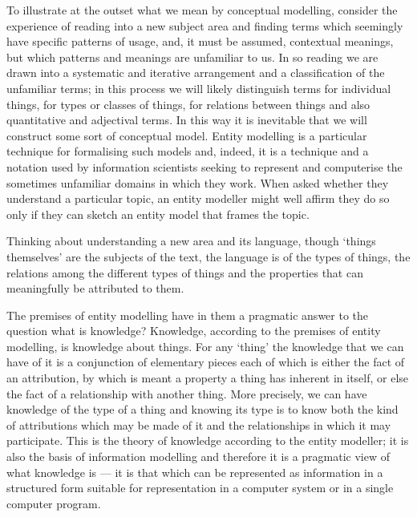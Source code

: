 To illustrate at the outset what we mean by conceptual modelling, consider the experience of reading into a new subject area and finding terms which seemingly have specific patterns of usage, and, it must be assumed, contextual meanings, but which patterns and meanings are unfamiliar to us. In so reading we are drawn into a systematic and iterative arrangement and a classification of the unfamiliar terms; in this process we will likely distinguish terms for individual things, for types or classes of things, for relations between things and also quantitative and adjectival terms. In this way it is inevitable that we will construct some sort of conceptual model. 
Entity modelling is a particular technique for formalising such models and, indeed, it is a technique and a notation used by information scientists seeking to represent and computerise the sometimes unfamiliar domains in which they work. When asked whether they understand a particular topic, an entity modeller might well affirm they do so only if they can sketch an entity model that frames the topic.

Thinking about understanding a new area and its language, though ‘things themselves’ are the subjects of the text, the language is of the types of things, the relations among the different types of things and the properties that can meaningfully be attributed to them. 

The premises of entity modelling have in them a pragmatic answer to the question what is knowledge? Knowledge, according to the premises of entity modelling, is knowledge about things. For any ‘thing’ the knowledge that we can have of it is a conjunction of elementary pieces each of which is either the fact of an attribution, by which is meant a property a thing has inherent in itself, or else the fact of a relationship with another thing. More precisely, we can have knowledge of the type of a thing and knowing its type is to know both the kind of attributions which may be made of it and the relationships in which it may participate. This is the theory of knowledge according to the entity modeller; it is also the basis of information modelling and therefore it is a pragmatic view of what knowledge is — it is that which can be represented as information in a structured form suitable for representation in a computer system or in a single computer program.

